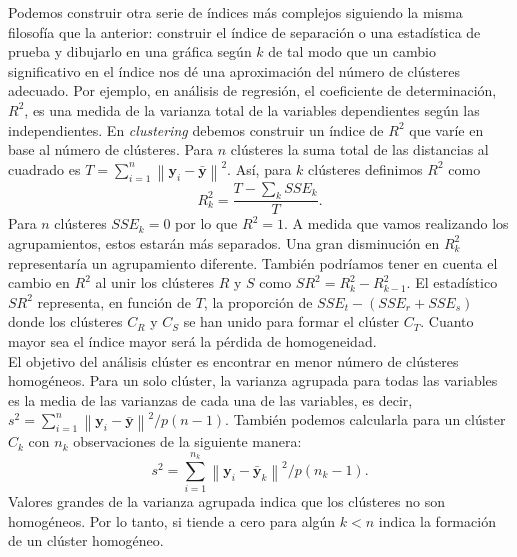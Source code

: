 \documentclass[a4paper, 20pt]{article}
\newcommand{\norm}[1]{\left\lVert#1\right\rVert}
\newcommand{\yy}{\textbf{y}}
\begin{document}
Podemos construir otra serie de índices más complejos siguiendo la misma filosofía que la anterior: construir el índice de separación o una estadística de prueba y dibujarlo en una gráfica según $ k $ de tal modo que un cambio significativo en el índice nos dé una aproximación del número de clústeres adecuado. Por ejemplo, en análisis de regresión, el coeficiente de determinación, $ R^2 $, es una medida de la varianza total de la variables dependientes según las independientes. En \textit{clustering} debemos construir un índice de $ R^2 $ que varíe en base al número de clústeres. Para $ n $ clústeres la suma total de las distancias al cuadrado es $ T = \sum_{i = 1}^{n} \norm{\yy_i - \bar{\yy}}^2 $. Así, para $ k $ clústeres definimos $ R^2 $ como
\[
R^{2}_{k} = \frac{T - \sum_k SSE_k}{T}.
\]
Para $ n $ clústeres $ SSE_k = 0 $ por lo que $ R^2 = 1 $. A medida que vamos realizando los agrupamientos, estos estarán más separados. Una gran disminución en $ R^2_k $ representaría un agrupamiento diferente. También podríamos tener en cuenta el cambio en $ R^2 $ al unir los clústeres $ R $ y $ S $ como $ SR^2 = R_k^2 - R^2_{k-1} $. El estadístico $ SR^2 $ representa, en función de $ T $, la proporción de $ SSE_t - (SSE_r + SSE_s) $ donde los clústeres $ C_R $ y $ C_S $ se han unido para formar el clúster $ C_T $.  Cuanto mayor sea el índice mayor será la pérdida de homogeneidad.\\

El objetivo del análisis clúster es encontrar en menor número de clústeres homogéneos. Para un solo clúster, la varianza agrupada para todas las variables es la media de las varianzas de cada una de las variables, es decir, $ s^2 = \sum_{i=1}^{n} \norm{\yy_i - \bar{\yy}}^2/ p(n-1)$. También podemos calcularla para un clúster $ C_k $ con $ n_k $ observaciones de la siguiente manera:
\[
s^2 = \sum_{i=1}^{n_k} \norm{\yy_i - \bar{\yy}_k}^2/ p(n_k-1).
\]
Valores grandes de la varianza agrupada indica que los clústeres no son homogéneos. Por lo tanto, si tiende a cero para algún $  k < n $ indica la formación de un clúster homogéneo. \\
\end{document}
